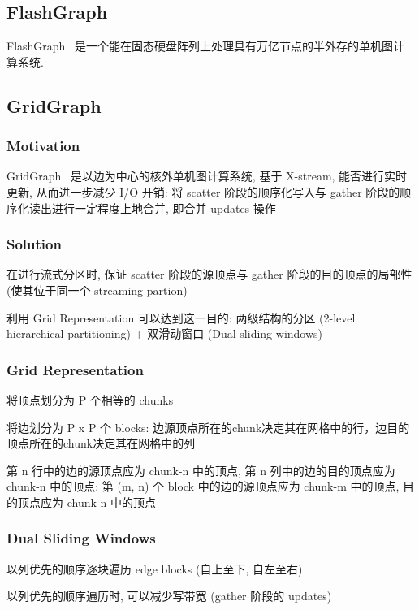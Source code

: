\documentclass[UTF8,12pt,a4paper]{article}
\begin{document}
\subsection{FlashGraph}
FlashGraph~\cite{DBLP:conf/fast/ZhengMBVPS15}
是一个能在固态硬盘阵列上处理具有万亿节点的半外存的单机图计算系统.

\subsection{GridGraph}
\subsubsection{Motivation}
GridGraph~\cite{DBLP:conf/usenix/ZhuHC15} 是以边为中心的核外单机图计算系统,
基于 X-stream, 能否进行实时更新, 从而进一步减少 I/O 开销:
将 scatter 阶段的顺序化写入与 gather 阶段的顺序化读出进行一定程度上地合并,
即合并 updates 操作
\subsubsection{Solution}
\begin{compactitem}
  \item 在进行流式分区时, 保证 scatter 阶段的源顶点与 gather 阶段的目的顶点的局部性 (使其位于同一个 streaming partion)
  \item 利用 Grid Representation 可以达到这一目的:
  两级结构的分区 (2-level hierarchical partitioning) + 双滑动窗口 (Dual sliding windows)
\end{compactitem}
\subsubsection{Grid Representation}
\begin{compactitem}
  \item 将顶点划分为 P 个相等的 chunks
  \item 将边划分为 P x P 个 blocks: 边源顶点所在的chunk决定其在网格中的行，边目的顶点所在的chunk决定其在网格中的列
\end{compactitem}
第 n 行中的边的源顶点应为 chunk-n 中的顶点,
第 n 列中的边的目的顶点应为 chunk-n 中的顶点: 第 (m, n) 个 block 中的边的源顶点应为 chunk-m 中的顶点,
目的顶点应为 chunk-n 中的顶点
\subsubsection{Dual Sliding Windows}
\begin{compactitem}
  \item 以列优先的顺序逐块遍历 edge blocks (自上至下, 自左至右)
  \item 以列优先的顺序遍历时, 可以减少写带宽 (gather 阶段的 updates)
\end{compactitem}
\end{document}
